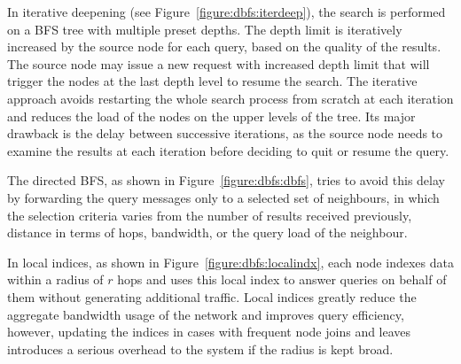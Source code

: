 In iterative deepening (see Figure~\ref{figure:dbfs:iterdeep}), the search is
performed on a BFS tree with multiple preset depths. The depth limit is
iteratively increased by the source node for each query, based on the quality of
the results. The source node may issue a new request with increased depth limit
that will trigger the nodes at the last depth level to resume the search. The
iterative approach avoids restarting the whole search process from scratch at
each iteration and reduces the load of the nodes on the upper levels of the
tree. Its major drawback is the delay between successive iterations, as the
source node needs to examine the results at each iteration before deciding to
quit or resume the query.

The directed BFS, as shown in Figure~\ref{figure:dbfs:dbfs}, tries to avoid this
delay by forwarding the query messages only to a selected set of neighbours, in
which the selection criteria varies from the number of results received
previously, distance in terms of hops, bandwidth, or the query load of the
neighbour.

In local indices, as shown in Figure~\ref{figure:dbfs:localindx}, each node
indexes data within a radius of $r$ hops and uses this local index to answer
queries on behalf of them without generating additional traffic. Local indices
greatly reduce the aggregate bandwidth usage of the network and improves query
efficiency, however, updating the indices in cases with frequent node joins and
leaves introduces a serious overhead to the system if the radius is kept broad.

